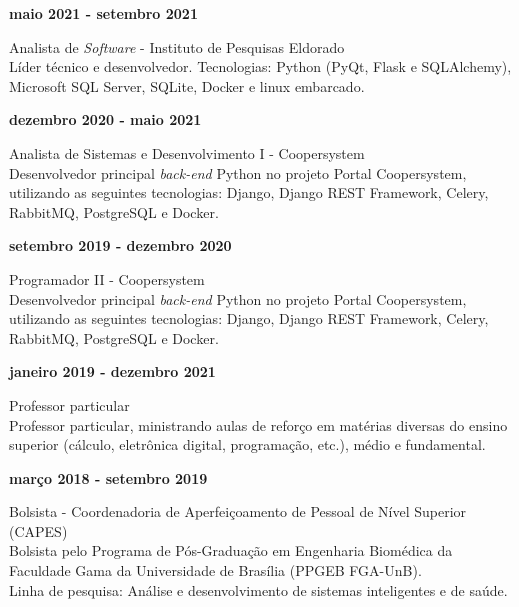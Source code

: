 \documentclass[11pt]{article}
\begin{document}
\newpage
\textbf{maio 2021 - setembro 2021}
\begin{addmargin}{0.5cm}
Analista de \textit{Software} - Instituto de Pesquisas Eldorado\\
Líder técnico e desenvolvedor. Tecnologias: Python (PyQt, Flask e SQLAlchemy), Microsoft SQL Server, SQLite, Docker e linux embarcado.\\
\end{addmargin}


\textbf{dezembro 2020 - maio 2021}
\begin{addmargin}{0.5cm}
    Analista de Sistemas e Desenvolvimento I - Coopersystem\\
    Desenvolvedor principal \textit{back-end} Python no projeto Portal Coopersystem,
    utilizando as seguintes tecnologias: Django, Django REST Framework, Celery, 
    RabbitMQ, PostgreSQL e Docker.\\
\end{addmargin}

\textbf{setembro 2019 - dezembro 2020}
\begin{addmargin}{0.5cm}
Programador II - Coopersystem\\
Desenvolvedor principal \textit{back-end} Python no projeto Portal Coopersystem,
utilizando as seguintes tecnologias: Django, Django REST Framework, Celery, 
RabbitMQ, PostgreSQL e Docker.\\
\end{addmargin}

\textbf{janeiro 2019 - dezembro 2021}
\begin{addmargin}{0.5cm}
Professor particular\\
Professor particular, ministrando aulas de reforço em matérias diversas
do ensino superior (cálculo, eletrônica digital, programação, etc.), médio
e fundamental.\\
\end{addmargin}

\textbf{março 2018 - setembro 2019}
\begin{addmargin}{0.5cm}
Bolsista - Coordenadoria de Aperfeiçoamento de Pessoal de Nível Superior (CAPES)\\
Bolsista pelo Programa de Pós-Graduação em Engenharia Biomédica
da Faculdade Gama da Universidade de Brasília (PPGEB FGA-UnB).\\
Linha de pesquisa: Análise e desenvolvimento de sistemas inteligentes e de saúde.\\
\end{addmargin}
\end{document}
